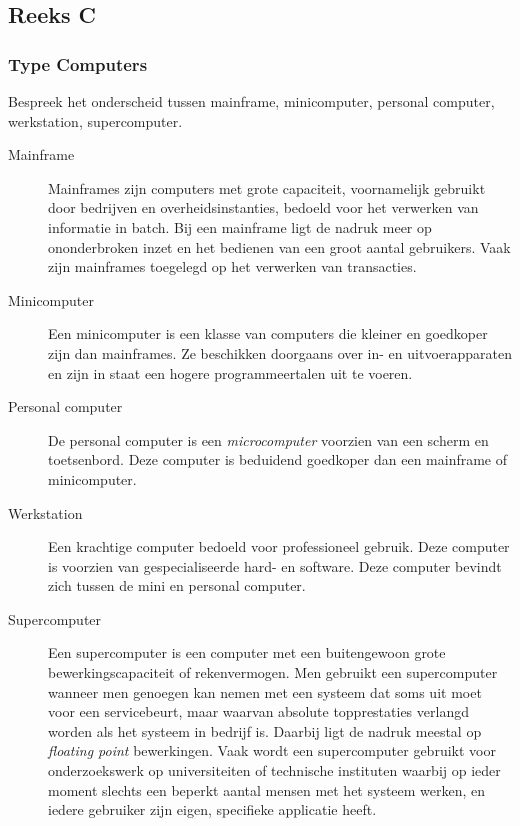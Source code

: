 \documentclass[../main.tex]{subfiles}
\begin{document}
\subsection{Reeks C}
\subsubsection{Type Computers}
\begin{question}
Bespreek het onderscheid tussen mainframe, minicomputer, personal computer, werkstation, supercomputer.
\end{question}
\begin{solution}
\begin{description}
	\item[Mainframe] Mainframes zijn computers met grote capaciteit, voornamelijk gebruikt door bedrijven en overheidsinstanties, bedoeld voor het verwerken van informatie in batch. Bij een mainframe ligt de nadruk meer op ononderbroken inzet en het bedienen van een groot aantal gebruikers. Vaak zijn mainframes toegelegd op het verwerken van transacties.
	\item[Minicomputer] Een minicomputer is een klasse van computers die kleiner en goedkoper zijn dan mainframes. Ze beschikken doorgaans over in- en uitvoerapparaten en zijn in staat een hogere programmeertalen uit te voeren.
	\item[Personal computer] De personal computer is een \emph{microcomputer} voorzien van een scherm en toetsenbord. Deze computer is beduidend goedkoper dan een mainframe of minicomputer.
	\item[Werkstation] Een krachtige computer bedoeld voor professioneel gebruik. Deze computer is voorzien van gespecialiseerde hard- en software. Deze computer bevindt zich tussen de mini en personal computer.
	\item[Supercomputer] Een supercomputer is een computer met een buitengewoon grote bewerkingscapaciteit of rekenvermogen. Men gebruikt een supercomputer wanneer men genoegen kan nemen met een systeem dat soms uit moet voor een servicebeurt, maar waarvan absolute topprestaties verlangd worden als het systeem in bedrijf is. Daarbij ligt de nadruk meestal op \emph{floating point} bewerkingen. Vaak wordt een supercomputer gebruikt voor onderzoekswerk op universiteiten of technische instituten waarbij op ieder moment slechts een beperkt aantal mensen met het systeem werken, en iedere gebruiker zijn eigen, specifieke applicatie heeft.
\end{description}
\end{solution}
\end{document}

